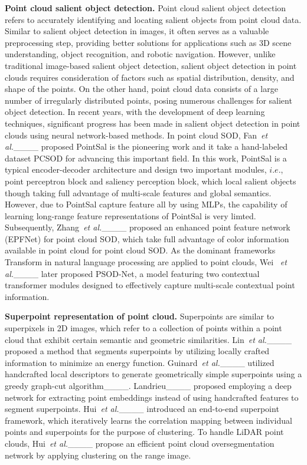 \noindent\textbf{Point cloud salient object detection.} Point cloud salient object detection refers to accurately identifying and locating salient objects from point cloud data. Similar to salient object detection in images, it often serves as a valuable preprocessing step, providing better solutions for applications such as 3D scene understanding, object recognition, and robotic navigation. However, unlike traditional image-based salient object detection, salient object detection in point clouds requires consideration of factors such as spatial distribution, density, and shape of the points. On the other hand, point cloud data consists of a large number of irregularly distributed points, posing numerous challenges for salient object detection. In recent years, with the development of deep learning techniques, significant progress has been made in salient object detection in point clouds using neural network-based methods. In point cloud SOD, Fan~\emph{et al.}____ proposed PointSal is the pioneering work and it take a hand-labeled dataset PCSOD for advancing this important field. In this work, PointSal is a typical encoder-decoder architecture and design two important modules, $i.e.$, point perceptron block and saliency perception block, which local salient objects though taking full advantage of multi-scale features and global semantics. However, due to PointSal capture feature all by using MLPs, the capability of learning long-range feature representations of PointSal is very limted. Subsequently, Zhang~\emph{et al.}____ proposed an enhanced point feature network (EPFNet) for point cloud SOD, which take full advantage of color information available in point cloud for point cloud SOD. As the dominant frameworks Transform in natural language processing are applied to point clouds, Wei ~\emph{et al.}____ later proposed PSOD-Net, a model featuring two contextual transformer modules designed to effectively capture multi-scale contextual point information.

\noindent\textbf{Superpoint representation of point cloud.} Superpoints are similar to superpixels in 2D images, which refer to a collection of points within a point cloud that exhibit certain semantic and geometric similarities. Lin~\emph{et al.}____ proposed a method that segments superpoints by utilizing locally crafted information to minimize an energy function. Guinard~\emph{et al.}____ utilized handcrafted local descriptors to generate geometrically simple superpoints using a greedy graph-cut algorithm____. Landrieu____ proposed employing a deep network for extracting point embeddings instead of using handcrafted features %
to segment superpoints. Hui~\emph{et al.}____ introduced an end-to-end superpoint framework, which iteratively learns the correlation mapping between individual points and superpoints for the purpose of clustering. To handle LiDAR point clouds, Hui~\emph{et al.}____ propose an efficient point cloud oversegmentation network by applying clustering on the range image.